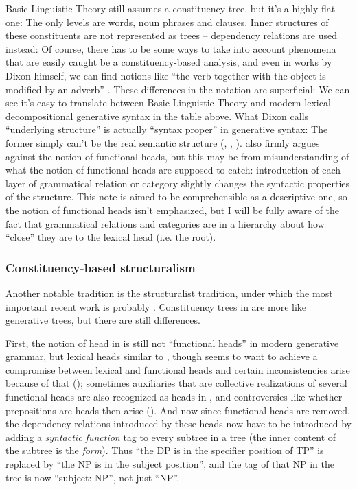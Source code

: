 \documentclass[UTF8, a4paper, oneside, scheme=plain]{ctexrep}
\newcommand*{\citepage}[1]{pp.~{#1}}
\begin{document}
Basic Linguistic Theory still assumes a constituency tree,
but it's a highly flat one:
The only levels are words, noun phrases and clauses.
Inner structures of these constituents are not represented as trees -- 
dependency relations are used instead:
Of course, there has to be some ways 
to take into account phenomena that are easily caught be a constituency-based analysis,
and even in works by Dixon himself,
we can find notions like ``the verb together with the object is modified by an adverb''
\citep[\citepage{376}]{dixon2005semantic}.
These differences in the notation are superficial:
We can see it's easy to translate between Basic Linguistic Theory 
and modern lexical-decompositional generative syntax
in the table above.
What Dixon calls ``underlying structure'' is actually ``syntax proper'' in generative syntax:
The former simply can't be the real semantic structure 
(, ,
).
\citet{dixon2009basic1} also firmly argues against the notion of functional heads,
but this may be from misunderstanding of what the notion of functional heads are supposed to catch:
introduction of each layer of grammatical relation or category slightly changes 
the syntactic properties of the structure.
This note is aimed to be comprehensible as a descriptive one,
so the notion of functional heads isn't emphasized,
but I will be fully aware of the fact that 
grammatical relations and categories are in a hierarchy 
about how ``close'' they are to the lexical head (i.e. the root).

\subsubsection{Constituency-based structuralism}

Another notable tradition is the structuralist tradition,
under which the most important recent work is probably \citet{cgel}.
Constituency trees in \citet{cgel} are more like generative trees,
but there are still differences.

First, the notion of head in \citet{cgel} is still not ``functional heads'' 
in modern generative grammar, but lexical heads similar to \citet{dixon2009basic1},
though \citet[\citepage{357}]{cgel} seems to want to achieve a compromise between lexical and functional heads 
and certain inconsistencies arise because of that ();
sometimes auxiliaries that are collective realizations of several functional heads 
are also recognized as heads in \citet{cgel}, 
and controversies like whether prepositions are heads then arise
().
And now since functional heads are removed,
the dependency relations introduced by these heads
now have to be introduced by adding a \emph{syntactic function} tag 
to every subtree in a tree
(the inner content of the subtree is the \emph{form}).
Thus ``the DP is in the specifier position of TP''
is replaced by ``the NP is in the subject position'',
and the tag of that NP in the tree is now ``subject: NP'',
not just ``NP''.
\end{document}
